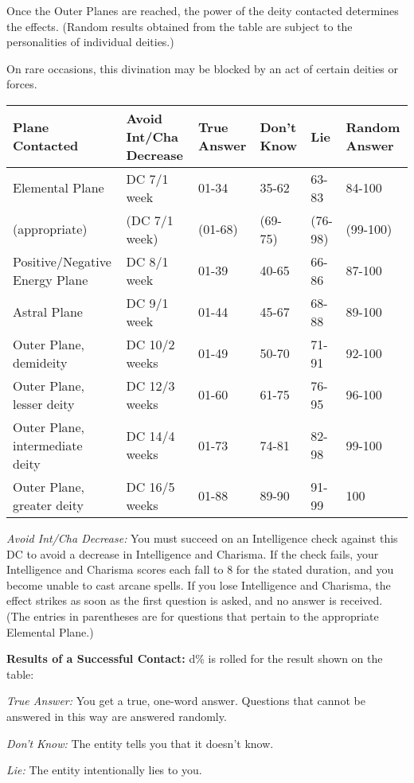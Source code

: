 \documentclass{article}
\begin{document}
Once the Outer Planes are reached, the power of the deity contacted determines 
the effects. (Random results obtained from the table are subject to the personalities 
of individual deities.)

On rare occasions, this divination may be blocked by an act of certain deities 
or forces.

\begin{tabular}{|>{\raggedright}p{82pt}|>{\raggedright}p{64pt}|>{\raggedright}p{35pt}|>{\raggedright}p{32pt}|>{\raggedright}p{19pt}|>{\raggedright}p{45pt}|}
\hline
P\textbf{lane Contacted} & A\textbf{void Int/Cha Decrease} & T\textbf{rue Answer} & D\textbf{on't 
Know} & L\textbf{ie} & R\textbf{andom Answer}\tabularnewline
\hline
Elemental Plane & DC 7/1 week & 01-34 & 35-62 & 63-83 & 84-100\tabularnewline
\hline
(appropriate) & (DC 7/1 week) & (01-68) & (69-75) & (76-98) & (99-100)\tabularnewline
\hline
Positive/Negative Energy Plane & DC 8/1 week & 01-39 & 40-65 & 66-86 & 87-100\tabularnewline
\hline
Astral Plane & DC 9/1 week & 01-44 & 45-67 & 68-88 & 89-100\tabularnewline
\hline
Outer Plane, demideity & DC 10/2 weeks & 01-49 & 50-70 & 71-91 & 92-100\tabularnewline
\hline
Outer Plane, lesser deity & DC 12/3 weeks & 01-60 & 61-75 & 76-95 & 96-100\tabularnewline
\hline
Outer Plane, intermediate deity & DC 14/4 weeks & 01-73 & 74-81 & 82-98 & 99-100\tabularnewline
\hline
Outer Plane, greater deity & DC 16/5 weeks & 01-88 & 89-90 & 91-99 & 100\tabularnewline
\hline
\end{tabular}

\textit{Avoid Int/Cha Decrease: }You must succeed on an Intelligence check against 
this DC to avoid a decrease in Intelligence and Charisma. If the check fails, your 
Intelligence and Charisma scores each fall to 8 for the stated duration, and you 
become unable to cast arcane spells. If you lose Intelligence and Charisma, the 
effect strikes as soon as the first question is asked, and no answer is received. 
(The entries in parentheses are for questions that pertain to the appropriate Elemental 
Plane.)

\textbf{Results of a Successful Contact:} d\% is rolled for the result shown on 
the table:

\textit{True Answer: }You get a true, one-word answer. Questions that cannot be 
answered in this way are answered randomly.

\textit{Don't Know: }The entity tells you that it doesn't know.

\textit{Lie: }The entity intentionally lies to you.
\end{document}
